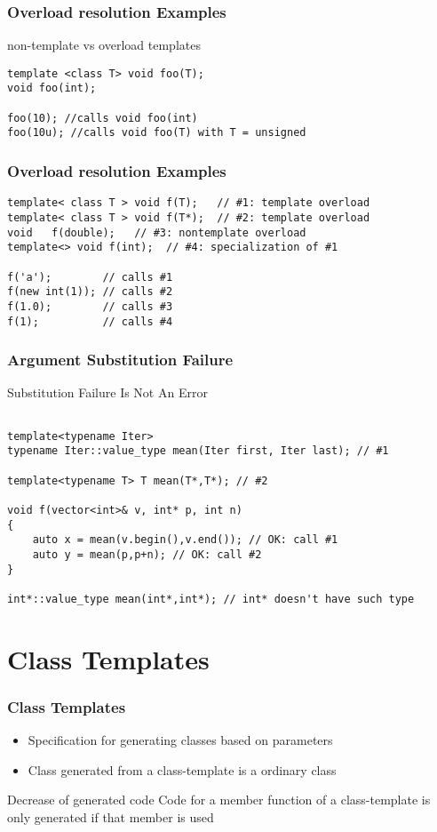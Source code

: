 \documentclass{beamer}
\begin{document}
\begin{frame}[fragile]
\frametitle{Overload resolution Examples}

\begin{block}{non-template vs overload templates}
\begin{lstlisting}
template <class T> void foo(T);
void foo(int);

foo(10); //calls void foo(int)
foo(10u); //calls void foo(T) with T = unsigned
\end{lstlisting}
\end{block}

\end{frame}

\begin{frame}[fragile]
\frametitle{Overload resolution Examples}

\begin{lstlisting}
template< class T > void f(T);   // #1: template overload
template< class T > void f(T*);  // #2: template overload
void   f(double);   // #3: nontemplate overload
template<> void f(int);  // #4: specialization of #1
 
f('a');        // calls #1
f(new int(1)); // calls #2
f(1.0);        // calls #3
f(1);          // calls #4
\end{lstlisting}
\end{frame}

\begin{frame}[fragile]
\frametitle{Argument Substitution Failure}

Substitution Failure Is Not An Error
\begin{lstlisting}

template<typename Iter> 
typename Iter::value_type mean(Iter first, Iter last); // #1

template<typename T> T mean(T*,T*); // #2

void f(vector<int>& v, int* p, int n)
{
    auto x = mean(v.begin(),v.end()); // OK: call #1
    auto y = mean(p,p+n); // OK: call #2
}

int*::value_type mean(int*,int*); // int* doesn't have such type
\end{lstlisting}
\end{frame}

\section{Class Templates}
\begin{frame}
\frametitle{Class Templates}

\begin{itemize}
\item Specification for generating classes based on parameters
\item Class generated from a class-template is a ordinary class
\end{itemize}

\begin{block}{Decrease of generated code}
Code for a member function of a class-template is only generated if that member is used
\end{block}

\end{frame}
\end{document}
